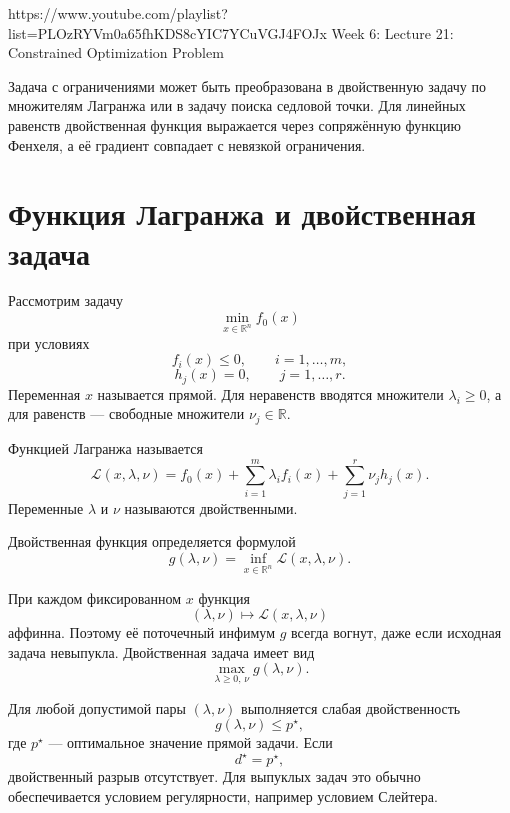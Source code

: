 
\sourcevideo
    {https://www.youtube.com/playlist?list=PLOzRYVm0a65fhKDS8cYIC7YCuVGJ4FOJx}
    {Week 6: Lecture 21: Constrained Optimization Problem}

Задача с ограничениями может быть преобразована в двойственную задачу
по множителям Лагранжа или в задачу поиска седловой точки. Для
линейных равенств двойственная функция выражается через сопряжённую
функцию Фенхеля, а её градиент совпадает с невязкой ограничения.

\section{Функция Лагранжа и двойственная задача}

Рассмотрим задачу
\[
    \min_{x\in\mathbb R^n} f_0(x)
\]
при условиях
\[
    f_i(x)\le0,
    \qquad
    i=1,\ldots,m,
\]
\[
    h_j(x)=0,
    \qquad
    j=1,\ldots,r.
\]
Переменная \(x\) называется прямой. Для неравенств вводятся множители
\(\lambda_i\ge0\), а для равенств --- свободные множители
\(\nu_j\in\mathbb R\).

\begin{definition}
Функцией Лагранжа называется
\[
    \mathcal L(x,\lambda,\nu)
    =
    f_0(x)
    +
    \sum_{i=1}^{m}\lambda_i f_i(x)
    +
    \sum_{j=1}^{r}\nu_j h_j(x).
\]
Переменные \(\lambda\) и \(\nu\) называются двойственными.
\end{definition}

\begin{definition}
Двойственная функция определяется формулой
\[
    g(\lambda,\nu)
    =
    \inf_{x\in\mathbb R^n}
    \mathcal L(x,\lambda,\nu).
\]
\end{definition}

При каждом фиксированном \(x\) функция
\[
    (\lambda,\nu)
    \longmapsto
    \mathcal L(x,\lambda,\nu)
\]
аффинна. Поэтому её поточечный инфимум \(g\) всегда вогнут, даже если
исходная задача невыпукла. Двойственная задача имеет вид
\[
    \max_{\lambda\ge0,\,\nu}g(\lambda,\nu).
\]

Для любой допустимой пары \((\lambda,\nu)\) выполняется слабая
двойственность
\[
    g(\lambda,\nu)\le p^\star,
\]
где \(p^\star\) --- оптимальное значение прямой задачи. Если
\[
    d^\star=p^\star,
\]
двойственный разрыв отсутствует. Для выпуклых задач это обычно
обеспечивается условием регулярности, например условием Слейтера.

